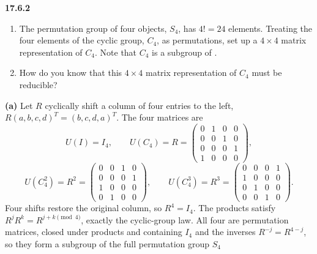 \par\bigskip
\noindent\textbf{17.6.2}
\begin{enumerate}
\item[(a)] The permutation group of four objects, $S_{4}$, has
$4!=24$ elements. Treating the four elements of the cyclic group,
$C_{4}$, as permutations, set up a $4\times4$ matrix representation
of $C_{4}$. Note that $C_{4}$ is a subgroup of .
\item[(b)] How do you know that this $4\times4$ matrix
representation of $C_{4}$ must be reducible?
\end{enumerate}
\solution
\textbf{(a)} Let $R$ cyclically shift a column of four entries to the
left, $R(a,b,c,d)^T=(b,c,d,a)^T$.
The four matrices are
\[
U(I)=I_4,\qquad
U(C_4)=R=\begin{pmatrix}
0&1&0&0\\0&0&1&0\\0&0&0&1\\1&0&0&0
\end{pmatrix},
\]
\[
U(C_4^2)=R^2=\begin{pmatrix}
0&0&1&0\\0&0&0&1\\1&0&0&0\\0&1&0&0
\end{pmatrix},\qquad
U(C_4^3)=R^3=\begin{pmatrix}
0&0&0&1\\1&0&0&0\\0&1&0&0\\0&0&1&0
\end{pmatrix}.
\]
Four shifts restore the original column, so $R^4=I_4$.
The products satisfy $R^jR^k=R^{j+k\pmod4}$, exactly the
cyclic-group law. All four are permutation matrices, closed under
products and containing $I_4$ and the inverses $R^{-j}=R^{4-j}$, so
they form a subgroup of the full permutation group $S_4$

